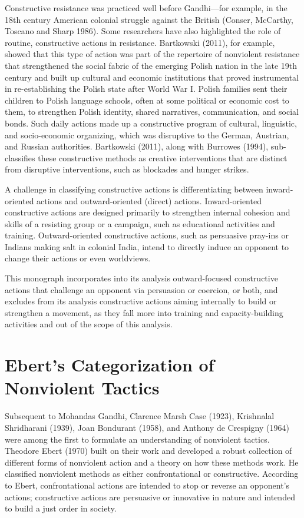 \documentclass[twoside,a4paper,12pt,fleqn,openany]{extbook}
\begin{document}
Constructive resistance was practiced well before Gandhi—for example, in the 18th century American colonial struggle against the British (Conser, McCarthy, Toscano and Sharp 1986). Some researchers have also highlighted the role of routine, constructive actions in resistance. Bartkowski (2011), for example, showed that this type of action was part of the repertoire of nonviolent resistance that strengthened the social fabric of the emerging Polish nation in the late 19th century and built up cultural and economic institutions that proved instrumental in re-establishing the Polish state after World War I. Polish families sent their children to Polish language schools, often at some political or economic cost to them, to strengthen Polish identity, shared narratives, communication, and social bonds. Such daily actions made up a constructive program of cultural, linguistic, and socio-economic organizing, which was disruptive to the German, Austrian, and Russian authorities. Bartkowski (2011), along with Burrowes (1994), sub-classifies these constructive methods as creative interventions that are distinct from disruptive interventions, such as blockades and hunger strikes.

A challenge in classifying constructive actions is differentiating between inward-oriented actions and outward-oriented (direct) actions. Inward-oriented constructive actions are designed primarily to strengthen internal cohesion and skills of a resisting group or a campaign, such as educational activities and training. Outward-oriented constructive actions, such as persuasive pray-ins or Indians making salt in colonial India, intend to directly induce an opponent to change their actions or even worldviews.

This monograph incorporates into its analysis outward-focused constructive actions that challenge an opponent via persuasion or coercion, or both, and excludes from its analysis constructive actions aiming internally to build or strengthen a movement, as they fall more into training and capacity-building activities and out of the scope of this analysis.

\section*{Ebert’s Categorization of Nonviolent Tactics}

Subsequent to Mohandas Gandhi, Clarence Marsh Case (1923), Krishnalal Shridharani (1939), Joan Bondurant (1958), and Anthony de Crespigny (1964) were among the first to formulate an understanding of nonviolent tactics. Theodore Ebert (1970) built on their work and developed a robust collection of different forms of nonviolent action and a theory on how these methods work. He classified nonviolent methods as either confrontational or constructive. According to Ebert, confrontational actions are intended to stop or reverse an opponent’s actions; constructive actions are persuasive or innovative in nature and intended to build a
just order in society.
\end{document}
